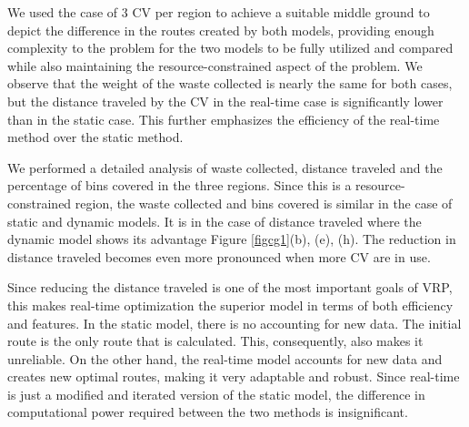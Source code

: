 \documentclass[12pt]{article}
\begin{document}
We used the case of 3 CV per region to achieve a suitable middle ground to depict the difference in the routes created by both models, providing enough complexity to the problem for the two models to be fully utilized and compared while also maintaining the resource-constrained aspect of the problem. We observe that the weight of the waste collected is nearly the same for both cases, but the distance traveled by the CV in the real-time case is significantly lower than in the static case. This further emphasizes the efficiency of the real-time method over the static method.

We performed a detailed analysis of waste collected, distance traveled and the percentage of bins covered in the three regions. Since this is a resource-constrained region, the waste collected and bins covered is similar in the case of static and dynamic models. It is in the case of distance traveled where the dynamic model shows its advantage {Figure \ref{figcg1}(b), (e), (h)}. The reduction in distance traveled becomes even more pronounced when more CV are in use.

Since reducing the distance traveled is one of the most important goals of VRP, this makes real-time optimization the superior model in terms of both efficiency and features. In the static model, there is no accounting for new data. The initial route is the only route that is calculated. This, consequently, also makes it unreliable. On the other hand, the real-time model accounts for new data and creates new optimal routes, making it very adaptable and robust. Since real-time is just a modified and iterated version of the static model, the difference in computational power required between the two methods is insignificant.
\end{document}
